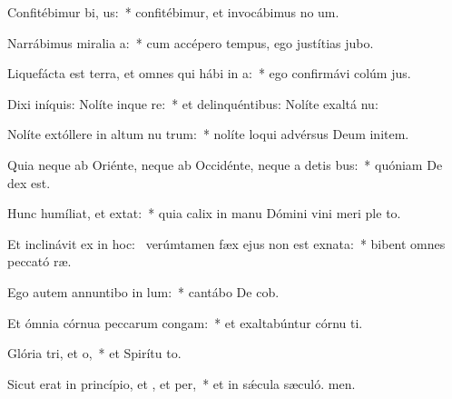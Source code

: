 \item Confitébimur bi, us:~* confitébimur, et invocábimus no um.
\item Narrábimus miralia a:~* cum accépero tempus, ego justítias jubo.
\item Liquefácta est terra, et omnes qui hábi in a:~* ego confirmávi colúm jus.
\item Dixi iníquis: Nolíte inque re:~* et delinquéntibus: Nolíte exaltá nu:
\item Nolíte extóllere in altum nu trum:~* nolíte loqui advérsus Deum initem.
\item Quia neque ab Oriénte, neque ab Occidénte, neque a detis bus:~* quóniam De dex est.
\item Hunc humíliat, et  extat:~* quia calix in manu Dómini vini meri ple to.
\item Et inclinávit ex  in hoc:~\pscross{} verúmtamen fæx ejus non est exnata:~* bibent omnes peccató ræ.
\item Ego autem annuntibo in lum:~* cantábo De cob.
\item Et ómnia córnua peccarum congam:~* et exaltabúntur córnu ti.
\item Glória tri, et o,~* et Spirítu to.
\item Sicut erat in princípio, et , et per,~* et in sǽcula sæculó. men.
